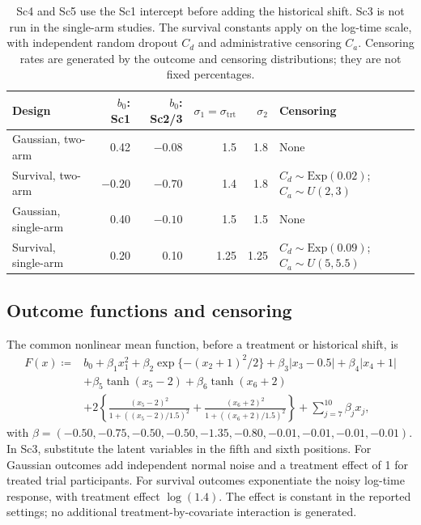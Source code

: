 \begin{table}[htbp]
\centering\small
\caption{Design-specific data-generating constants.}\label{tab:S2}
\begin{tabular}{p{1.25in}rrrrp{1.1in}}
\toprule
Design & $b_0$: Sc1 & $b_0$: Sc2/3 & $\sigma_1=\sigma_{\mathrm{trt}}$ & $\sigma_2$ & Censoring\\\midrule
Gaussian, two-arm & 0.42 & $-0.08$ & 1.5 & 1.8 & None\\
Survival, two-arm & $-0.20$ & $-0.70$ & 1.4 & 1.8 & $C_d\sim\mathrm{Exp}(0.02)$; $C_a\sim U(2,3)$\\
Gaussian, single-arm & 0.40 & $-0.10$ & 1.5 & 1.5 & None\\
Survival, single-arm & 0.20 & 0.10 & 1.25 & 1.25 & $C_d\sim\mathrm{Exp}(0.09)$; $C_a\sim U(5,5.5)$\\
\bottomrule
\end{tabular}
\caption*{Sc4 and Sc5 use the Sc1 intercept before adding the historical shift. Sc3 is not run in the single-arm studies. The survival constants apply on the log-time scale, with independent random dropout $C_d$ and administrative censoring $C_a$. Censoring rates are generated by the outcome and censoring distributions; they are not fixed percentages.}
\end{table}

\subsection{Outcome functions and censoring}\label{sec:E.2}
The common nonlinear mean function, before a treatment or historical shift, is
\begin{equation}\label{eq:dgp}
\begin{aligned}
F(x)\coloneqq {}&b_0+\beta_1x_1^2+\beta_2\exp\{-(x_2+1)^2/2\}
+\beta_3|x_3-0.5|+\beta_4|x_4+1|\\
&+\beta_5\tanh(x_5-2)+\beta_6\tanh(x_6+2)\\
&+2\left\{\frac{(x_5-2)^2}{1+((x_5-2)/1.5)^2}
+\frac{(x_6+2)^2}{1+((x_6+2)/1.5)^2}\right\}
+\sum_{j=7}^{10}\beta_jx_j,
\end{aligned}
\end{equation}
with $\beta=(-0.50,-0.75,-0.50,-0.50,-1.35,-0.80,-0.01,-0.01,-0.01,-0.01)$. In Sc3, substitute the latent variables in the fifth and sixth positions. For Gaussian outcomes add independent normal noise and a treatment effect of 1 for treated trial participants. For survival outcomes exponentiate the noisy log-time response, with treatment effect $\log(1.4)$. The effect is constant in the reported settings; no additional treatment-by-covariate interaction is generated.

